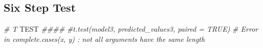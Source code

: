 \documentclass[
]{article}
\newenvironment{Shaded}{\begin{snugshade}}{\end{snugshade}}
\newcommand{\AlertTok}[1]{\textcolor[rgb]{0.94,0.16,0.16}{#1}}
\newcommand{\CommentTok}[1]{\textcolor[rgb]{0.56,0.35,0.01}{\textit{#1}}}
\begin{document}
\hypertarget{six-step-test}{%
\subsection{Six Step Test}\label{six-step-test}}

\begin{Shaded}
\begin{Highlighting}[]
\CommentTok{\# T }\AlertTok{TEST}\CommentTok{ \#\#\#\#}
\CommentTok{\#t.test(model3, predicted\_values3, paired = TRUE)}
\CommentTok{\# Error in complete.cases(x, y) : not all arguments have the same length}
\end{Highlighting}
\end{Shaded}
\end{document}
